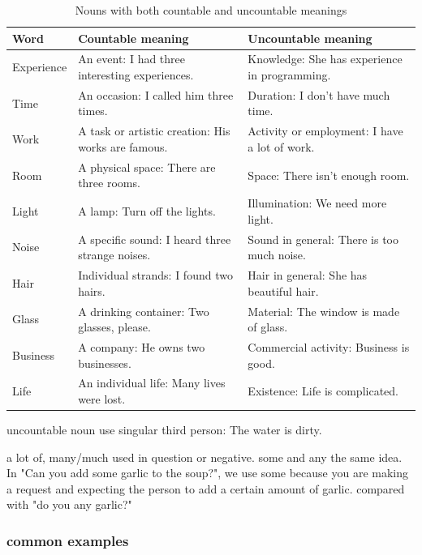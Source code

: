 \documentclass[a4paper,11pt,twoside]{book}
\begin{document}
\begin{table}[htbp]
\centering
\begin{tabular}{|l|p{5.5cm}|p{5.5cm}|}
\hline
\textbf{Word} & \textbf{Countable meaning} & \textbf{Uncountable meaning} \\
\hline
Experience & An event: I had three interesting experiences. & Knowledge: She has experience in programming. \\
\hline
Time & An occasion: I called him three times. & Duration: I don't have much time. \\
\hline
Work & A task or artistic creation: His works are famous. & Activity or employment: I have a lot of work. \\
\hline
Room & A physical space: There are three rooms. & Space: There isn't enough room. \\
\hline
Light & A lamp: Turn off the lights. & Illumination: We need more light. \\
\hline
Noise & A specific sound: I heard three strange noises. & Sound in general: There is too much noise. \\
\hline
Hair & Individual strands: I found two hairs. & Hair in general: She has beautiful hair. \\
\hline
Glass & A drinking container: Two glasses, please. & Material: The window is made of glass. \\
\hline
Business & A company: He owns two businesses. & Commercial activity: Business is good. \\
\hline
Life & An individual life: Many lives were lost. & Existence: Life is complicated. \\
\hline
\end{tabular}
\caption{Nouns with both countable and uncountable meanings}
\end{table}

\par uncountable noun use singular third person:
	The water is dirty. 
	
\par a lot of, many/much used in question or negative. some and any the same idea. In "Can you add some garlic to the soup?", we use some because you are making a request and expecting the person to add a certain amount of garlic. compared with "do you any garlic?"
	
\subsubsection{common examples}
\end{document}
